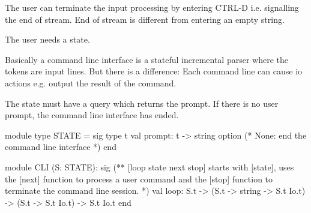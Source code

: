 The user can terminate the input processing by entering CTRL-D i.e. signalling
the end of stream. End of stream is different from entering an empty string.

The user needs a state.

Basically a command line interface is a stateful incremental parser where the
tokens are input lines. But there is a difference: Each command line can cause
io actions e.g. output the result of the command.

The state must have a query which returns the prompt. If there is no user
prompt, the command line interface has ended.

\begin{ocaml}
  module type STATE =
  sig
    type t
    val prompt: t -> string option (* None: end the command line interface *)
  end

  module CLI (S: STATE):
  sig
    (** [loop state next stop] starts with [state], uses the [next] function
        to process a user command and the [stop] function to terminate the
        command line session. *)
    val loop: S.t -> (S.t -> string -> S.t Io.t) -> (S.t -> S.t Io.t) -> S.t Io.t
  end
\end{ocaml}



